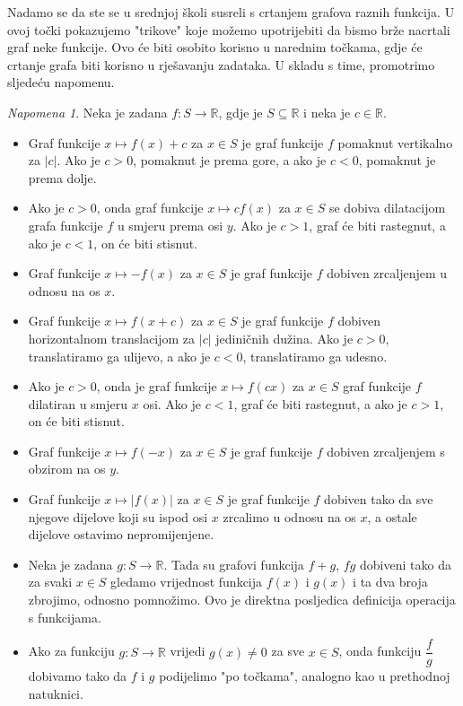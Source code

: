 \documentclass{book}
\theoremstyle{definition}
\theoremstyle{definition}
\theoremstyle{remark}
\newtheorem{remark}{Napomena}
\begin{document}
Nadamo se da ste se u srednjoj školi susreli s crtanjem grafova raznih funkcija. U ovoj točki pokazujemo "trikove" koje možemo upotrijebiti da bismo brže nacrtali graf neke funkcije. Ovo će biti osobito korisno u narednim točkama, gdje će crtanje grafa biti korisno u rješavanju zadataka. U skladu s time, promotrimo sljedeću napomenu.
\begin{remark}
\label{graphrem}
Neka je zadana $f : S\to \mathbb{R}$, gdje je $S\subseteq \mathbb{R}$ i neka je $c\in \mathbb{R}$.
\begin{itemize}
\item Graf funkcije $x\mapsto f(x)+c$ za $x\in S$ je graf funkcije $f$ pomaknut vertikalno za $|c|$. Ako je $c>0$, pomaknut je prema gore, a ako je $c<0$, pomaknut je prema dolje.
\item Ako je $c>0$, onda graf funkcije $x\mapsto cf(x)$ za $x\in S$ se dobiva dilatacijom grafa funkcije $f$ u smjeru prema osi $y$. Ako je $c>1$, graf će biti rastegnut, a ako je $c<1$, on će biti stisnut.
\item Graf funkcije $x\mapsto -f(x)$ za $x\in S$ je graf funkcije $f$ dobiven zrcaljenjem u odnosu na os $x$.
\item Graf funkcije $x\mapsto f(x+c)$ za $x\in S$ je graf funkcije $f$ dobiven horizontalnom translacijom za $|c|$ jediničnih dužina. Ako je $c>0$, translatiramo ga ulijevo, a ako je $c<0$, translatiramo ga udesno.
\item Ako je $c>0$, onda je graf funkcije $x\mapsto f(cx)$ za $x\in S$ graf funkcije $f$ dilatiran u smjeru $x$ osi. Ako je $c<1$, graf će biti rastegnut, a ako je $c>1$, on će biti stisnut.
\item Graf funkcije $x\mapsto f(-x)$ za $x\in S$ je graf funkcije $f$ dobiven zrcaljenjem s obzirom na os $y$.
\item Graf funkcije $x\mapsto |f(x)|$ za $x\in S$ je graf funkcije $f$ dobiven tako da sve njegove dijelove koji su ispod osi $x$ zrcalimo u odnosu na os $x$, a ostale dijelove ostavimo nepromijenjene.
\item Neka je zadana $g : S\to \mathbb{R}$. Tada su grafovi funkcija $f+g$, $fg$ dobiveni tako da za svaki $x\in S$ gledamo vrijednost funkcija $f(x)$ i $g(x)$ i ta dva broja zbrojimo, odnosno pomnožimo. Ovo je direktna posljedica definicija operacija s funkcijama.
\item Ako za funkciju $g : S\to \mathbb{R}$ vrijedi $g(x)\neq 0$ za sve $x\in S$, onda funkciju $\dfrac{f}{g}$ dobivamo tako da $f$ i $g$ podijelimo "po točkama", analogno kao u prethodnoj natuknici.
\end{itemize}
\end{remark}
\end{document}
